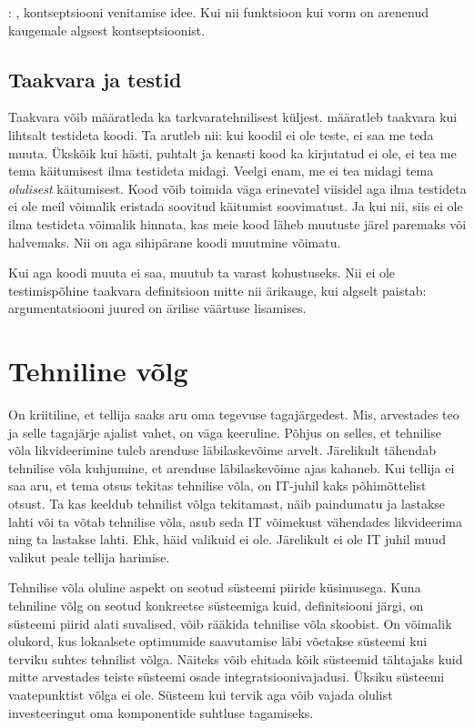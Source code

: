 \TODO:  \cite{nlp}, kontseptsiooni venitamise idee. Kui nii funktsioon kui vorm on arenenud kaugemale algsest kontseptsioonist.

\subsection{Taakvara ja testid}
Taakvara võib määratleda ka tarkvaratehnilisest küljest. \citeauthor{feathers2004working} määratleb taakvara kui lihtsalt testideta koodi. \cite{feathers2004working} Ta arutleb nii: kui koodil ei ole teste, ei saa me teda muuta. Ükskõik kui hästi, puhtalt ja kenasti kood ka kirjutatud ei ole, ei tea me tema käitumisest ilma testideta midagi. Veelgi enam, me ei tea midagi tema \emph{olulisest} käitumisest. Kood võib toimida väga erinevatel viisidel aga ilma testideta ei ole meil võimalik eristada soovitud käitumist soovimatust. Ja kui nii, siis ei ole ilma testideta võimalik hinnata, kas meie kood läheb muutuste järel paremaks või halvemaks. Nii on aga sihipärane koodi muutmine võimatu.

Kui aga koodi muuta ei saa, muutub ta varast kohustuseks. Nii ei ole testimispõhine taakvara definitsioon mitte nii ärikauge, kui algselt paistab: argumentatsiooni juured on ärilise väärtuse lisamises.

\section{Tehniline võlg}
On kriitiline, et tellija saaks aru oma tegevuse tagajärgedest. Mis, arvestades teo ja selle tagajärje ajalist vahet, on väga keeruline. Põhjus on selles, et tehnilise võla likvideerimine tuleb arenduse läbilaskevõime arvelt. Järelikult tähendab tehnilise võla kuhjumine, et arenduse läbilaskevõime ajas kahaneb. Kui tellija ei saa aru, et tema otsus tekitas tehnilise võla, on IT-juhil kaks põhimõttelist otsust. Ta kas keeldub tehnilist võlga tekitamast, näib paindumatu ja lastakse lahti või ta võtab tehnilise võla, asub seda IT võimekust vähendades likvideerima ning ta lastakse lahti. Ehk, häid valikuid ei ole. Järelikult ei ole IT juhil muud valikut peale tellija harimise.

Tehnilise võla oluline aspekt on seotud süsteemi piiride küsimusega. Kuna tehniline võlg on seotud konkreetse süsteemiga kuid, definitsiooni järgi, on süsteemi piirid alati suvalised, võib rääkida tehnilise võla skoobist. On võimalik olukord, kus lokaalsete optimumide saavutamise läbi võetakse süsteemi kui terviku suhtes tehnilist võlga. Näiteks võib ehitada kõik süsteemid tähtajaks kuid mitte arvestades teiste süsteemi osade integratsioonivajadusi. Üksiku süsteemi vaatepunktist võlga ei ole. Süsteem kui tervik aga võib vajada olulist investeeringut oma komponentide suhtluse tagamiseks. 

